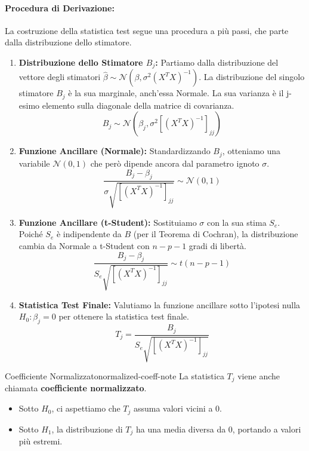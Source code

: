 \paragraph{Procedura di Derivazione:} La costruzione della statistica test segue una procedura a più passi, che parte dalla distribuzione dello stimatore.
\begin{enumerate}
    \item \textbf{Distribuzione dello Stimatore \(B_j\):} Partiamo dalla distribuzione del vettore degli stimatori \(\hat{\beta} \sim \mathcal{N}(\beta, \sigma^2(X^T X)^{-1})\). La distribuzione del singolo stimatore \(B_j\) è la sua marginale, anch'essa Normale. La sua varianza è il j-esimo elemento sulla diagonale della matrice di covarianza.
    \[
        B_j \sim \mathcal{N}\left(\beta_j, \sigma^2[(X^T X)^{-1}]_{jj}\right)
    \]

    \item \textbf{Funzione Ancillare (Normale):} Standardizzando \(B_j\), otteniamo una variabile \(\mathcal{N}(0,1)\) che però dipende ancora dal parametro ignoto \(\sigma\).
    \[
        \frac{B_j - \beta_j}{\sigma\sqrt{[(X^T X)^{-1}]_{jj}}} \sim \mathcal{N}(0,1)
    \]
    
    \item \textbf{Funzione Ancillare (t-Student):} Sostituiamo \(\sigma\) con la sua stima \(S_e\). Poiché \(S_e\) è indipendente da \(B\) (per il Teorema di Cochran), la distribuzione cambia da Normale a t-Student con \(n-p-1\) gradi di libertà.
    \[
        \frac{B_j - \beta_j}{S_e\sqrt{[(X^T X)^{-1}]_{jj}}} \sim t(n-p-1)
    \]
    
    \item \textbf{Statistica Test Finale:} Valutiamo la funzione ancillare sotto l'ipotesi nulla \(H_0: \beta_j = 0\) per ottenere la statistica test finale.
    \[
        T_j = \frac{B_j}{S_e\sqrt{[(X^T X)^{-1}]_{jj}}}
    \]
\end{enumerate}

\begin{nota}{Coefficiente Normalizzato}{normalized-coeff-note}
La statistica \(T_j\) viene anche chiamata \textbf{coefficiente normalizzato}.
\begin{itemize}
    \item Sotto \(H_0\), ci aspettiamo che \(T_j\) assuma valori vicini a 0.
    \item Sotto \(H_1\), la distribuzione di \(T_j\) ha una media diversa da 0, portando a valori più estremi.
\end{itemize}
\end{nota}

